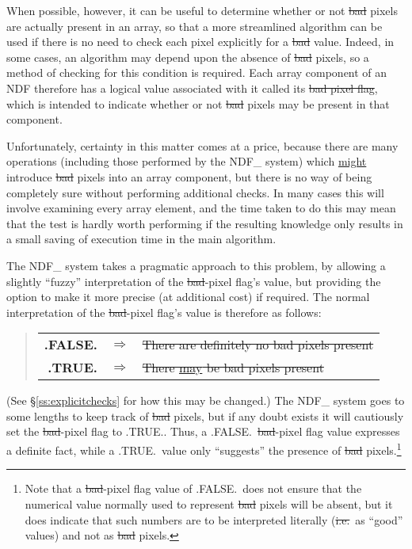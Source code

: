 When possible, however, it can be useful to determine whether or not
\st{bad\/} pixels are actually present in an array, so that a more
streamlined 
algorithm can be used if there is no need to check each pixel explicitly for
a \st{bad\/} value. 
Indeed, in some cases, an algorithm may depend upon the absence of \st{bad\/}
pixels, so a method of checking for this condition is required. 
Each array component of an NDF therefore has a logical value associated with
it called its \st{bad pixel flag}, which is intended to indicate whether or
not \st{bad\/} pixels may be present in that component. 

Unfortunately, certainty in this matter comes at a price, because there are
many operations (including those performed by the NDF\_ system) which
\underline{might} introduce \st{bad\/} pixels into an array component, but
there is no way of being completely sure without performing additional
checks. 
In many cases this will involve examining every array element, and the time
taken to do this may mean that the test is hardly worth performing if the
resulting knowledge only results in a small saving of execution time in the
main algorithm. 

The NDF\_ system takes a pragmatic approach to this problem, by allowing a
slightly ``fuzzy'' interpretation of the \st{bad\/}-pixel flag's value, but
providing the option to make it more precise (at additional cost) if
required. 
The normal interpretation of the \st{bad\/}-pixel flag's value is therefore
as follows: 

\small
\begin{quote}
\begin{center}
\begin{tabular}{rcl}
{\bf .FALSE.} & $\Rightarrow$ & \st{There are definitely no bad pixels 
present}\\
{\bf .TRUE.} & $\Rightarrow$ & \st{There \underline{may} be bad pixels
present} 
\end{tabular}
\end{center}
\end{quote}
\normalsize

(See \S\ref{ss:explicitchecks} for how this may be changed.)
The NDF\_ system goes to some lengths to keep track of \st{bad\/} pixels, but if
any doubt exists it will cautiously set the \st{bad\/}-pixel flag to .TRUE.. 
Thus, a .FALSE.\ \st{bad\/}-pixel flag value expresses a definite fact, while
a .TRUE.\ value only ``suggests'' the presence of \st{bad\/}
pixels.\footnote{Note that a \st{bad\/}-pixel flag value of .FALSE.\ does not
ensure that the numerical value normally used to represent \st{bad\/} pixels
will be absent, but it does indicate that such numbers are to be interpreted
literally (\st{i.e.}\ as ``good'' values) and not as \st{bad\/} pixels.} 

